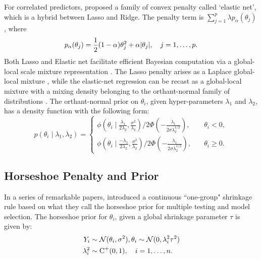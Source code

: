 \documentclass[11pt]{article}
\numberwithin{equation}{section}
\begin{document}
For correlated predictors, \cite{zou2005regularization} proposed a family of convex penalty called `elastic net', which is a hybrid between Lasso and Ridge. The penalty term is $\sum_{j=1}^{p} \lambda p_{\alpha}(\theta_j)$, where 
\[
p_{\alpha}(\theta_j) = \frac{1}{2} (1-\alpha)\theta_j^2 + \alpha \lvert\theta_j\rvert, \quad j = 1, \ldots, p. 
\]
Both Lasso and Elastic net facilitate efficient Bayesian computation via a global-local scale mixture representation \cite{bhadra2016global}. The Lasso penalty arises as a Laplace global-local mixture \citep{andrews1974scale}, while the elastic-net regression can be recast as a global-local mixture with a mixing density belonging to the orthant-normal family of distributions \citep{hans2011elastic}.  The orthant-normal prior on $\theta_i$, given hyper-parameters $\lambda_1$ and $\lambda_2$, 
has a density function with the following form:
\begin{equation}
  p(\theta_i \mid \lambda_1, \lambda_2)  = 
  \begin{cases} 
   \phi(\theta_i \mid \frac{\lambda_1}{2\lambda_2}, \frac{\sigma^2}{\lambda_2}) / 2\Phi\left(-\frac{\lambda_1}{2\sigma \lambda_2^{1/2} }\right), & \quad \theta_i < 0, \\
   \phi(\theta_i \mid \frac{-\lambda_1}{2\lambda_2}, \frac{\sigma^2}{\lambda_2}) / 2\Phi\left(-\frac{\lambda_1}{2\sigma \lambda_2^{1/2} }\right), & \quad \theta_i \geq 0. \end{cases} 
  \label{eq:hans}
\end{equation}
 

\subsection{Horseshoe Penalty and Prior}\label{sec:one-gp}


In a series of remarkable papers, \citet*{carvalho2009handling, carvalho2010horseshoe, polson2010shrink, polson2012half} introduced a continuous ``one-group" shrinkage rule based on what they call the horseshoe prior for multiple testing and model selection. The horseshoe prior for $\theta_i$, given a global shrinkage parameter $\tau$ is given by: 
\begin{align}
Y_i & \sim {\cal N}(\theta_i , \sigma^2), \theta_i \sim {\cal N}(0, \lambda_i^2 \tau^2) \nonumber \\
\lambda_i ^2 & \sim \operatorname{C}^{+}(0,1), \quad i = 1, \ldots, n. \label{eq:hs}
\end{align}
\end{document}
